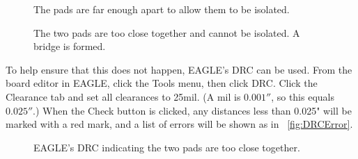 \documentclass[11pt]{book}
\begin{document}
\begin{figure}
	\caption{The pads are far enough apart to allow them to be isolated.}
	\label{fig:GoodClearance}
\end{figure}

\begin{figure}
	\caption{The two pads are too close together and cannot be isolated. A bridge is formed.}
	\label{fig:TooClose}
\end{figure}

To help ensure that this does not happen, EAGLE's DRC can be used. From the board editor in EAGLE, click the Tools menu, then click DRC. Click the Clearance tab and set all clearances to 25mil. (A mil is $0.001''$, so this equals $0.025''$.) When the Check button is clicked, any distances less than 0.025" will be marked with a red mark, and a list of errors will be shown as in \figurename~\vref{fig:DRCError}.

\begin{figure}
	\caption{EAGLE's DRC indicating the two pads are too close together.}
	\label{fig:DRCError}
\end{figure}
\end{document}

